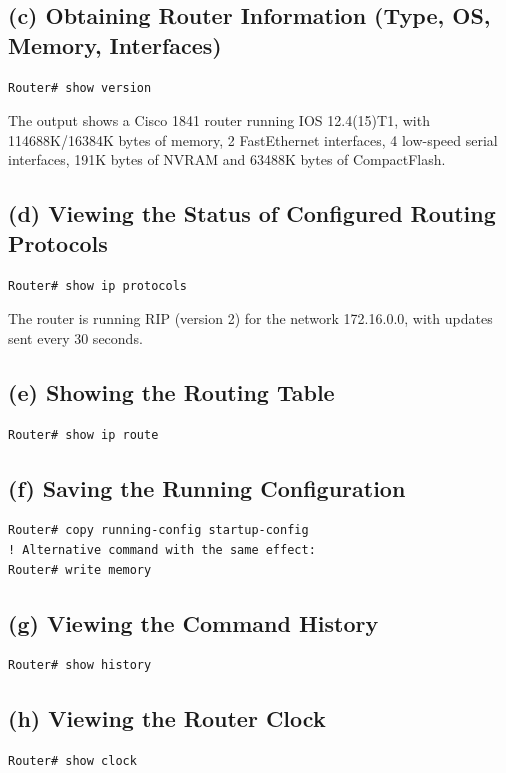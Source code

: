 \documentclass[12pt, a4paper]{report}
\begin{document}
\subsection*{(c) Obtaining Router Information (Type, OS, Memory, Interfaces)}
\begin{lstlisting}
Router# show version
\end{lstlisting}
The output shows a Cisco 1841 router running IOS 12.4(15)T1, with 114688K/16384K bytes of memory, 2 FastEthernet interfaces, 4 low-speed serial interfaces, 191K bytes of NVRAM and 63488K bytes of CompactFlash.

\subsection*{(d) Viewing the Status of Configured Routing Protocols}
\begin{lstlisting}
Router# show ip protocols
\end{lstlisting}
The router is running RIP (version 2) for the network 172.16.0.0, with updates sent every 30 seconds.

\subsection*{(e) Showing the Routing Table}
\begin{lstlisting}
Router# show ip route
\end{lstlisting}

\subsection*{(f) Saving the Running Configuration}
\begin{lstlisting}
Router# copy running-config startup-config
! Alternative command with the same effect:
Router# write memory
\end{lstlisting}

\subsection*{(g) Viewing the Command History}
\begin{lstlisting}
Router# show history
\end{lstlisting}

\subsection*{(h) Viewing the Router Clock}
\begin{lstlisting}
Router# show clock
\end{lstlisting}
\end{document}
